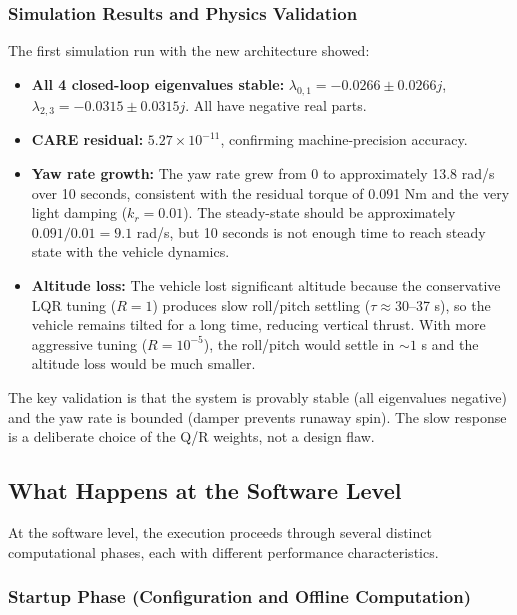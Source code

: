 \documentclass[12pt, a4paper]{article}
\begin{document}
\subsubsection{Simulation Results and Physics Validation}

The first simulation run with the new architecture showed:

\begin{itemize}
    \item \textbf{All 4 closed-loop eigenvalues stable:} $\lambda_{0,1} = -0.0266 \pm 0.0266j$, $\lambda_{2,3} = -0.0315 \pm 0.0315j$.  All have negative real parts.

    \item \textbf{CARE residual:} $5.27 \times 10^{-11}$, confirming machine-precision accuracy.

    \item \textbf{Yaw rate growth:} The yaw rate grew from 0 to approximately 13.8 rad/s over 10 seconds, consistent with the residual torque of 0.091 Nm and the very light damping ($k_r = 0.01$).  The steady-state should be approximately $0.091/0.01 = 9.1$ rad/s, but 10 seconds is not enough time to reach steady state with the vehicle dynamics.

    \item \textbf{Altitude loss:} The vehicle lost significant altitude because the conservative LQR tuning ($R = 1$) produces slow roll/pitch settling ($\tau \approx 30$--37 s), so the vehicle remains tilted for a long time, reducing vertical thrust.  With more aggressive tuning ($R = 10^{-5}$), the roll/pitch would settle in $\sim 1$ s and the altitude loss would be much smaller.
\end{itemize}

The key validation is that the system is provably stable (all eigenvalues negative) and the yaw rate is bounded (damper prevents runaway spin).  The slow response is a deliberate choice of the Q/R weights, not a design flaw.

\subsection{What Happens at the Software Level}

At the software level, the execution proceeds through several distinct computational phases, each with different performance characteristics.

\subsubsection{Startup Phase (Configuration and Offline Computation)}
\end{document}
